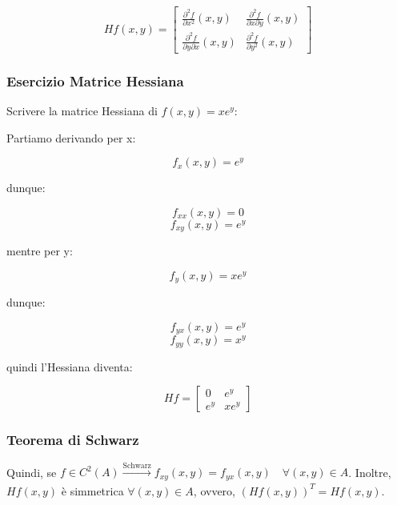 \[
    Hf(x,y) = \begin{bmatrix}
        \displaystyle\frac{\partial^{2} f}{\partial x^{2}}(x,y)        & \displaystyle\frac{\partial^{2} f}{\partial x \partial y}(x,y) \\[5mm]
        \displaystyle\frac{\partial^{2} f}{\partial y \partial x}(x,y) & \displaystyle\frac{\partial^{2} f}{\partial y^{2}}(x,y)
    \end{bmatrix}
\]

\subsubsection*{Esercizio Matrice Hessiana}

Scrivere la matrice Hessiana di \(f(x,y)= xe ^{y}\):

Partiamo derivando per x:

\[
    f_x(x,y) = e ^{y}
\]

dunque:

\[
    f_{xx}(x,y) = 0
\]
\[
    f_{xy}(x,y) = e ^{y}
\]

mentre per y:

\[
    f_y(x,y) = x e ^{y}
\]

dunque:

\[
    f_{yx}(x,y) = e ^{y}
\]
\[
    f_{yy}(x,y) = x ^{y}
\]

quindi l'Hessiana diventa:

\[
    Hf = \begin{bmatrix}
        0      & e ^{y}  \\
        e ^{y} & x e^{y}
    \end{bmatrix}
\]

\pagebreak
\subsubsection{Teorema di Schwarz}


Quindi, se \(f \in C^{2} (A) \xrightarrow[]{\text{Schwarz}} f_{xy}(x,y) = f_{yx}(x,y) \quad \forall (x,y) \in A\). Inoltre, \(H f(x,y)\) è simmetrica \(\forall (x,y) \in A\), ovvero, \({(Hf(x,y))}^{T}=Hf(x,y)\).

